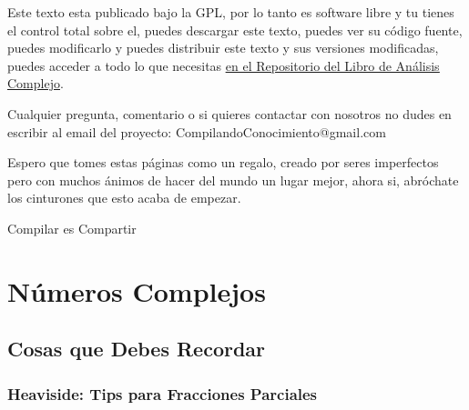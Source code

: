 \documentclass[12pt, fleqn]{report}                             %
\theoremstyle{break}                                            %
\begin{document}
    Este texto esta publicado bajo la GPL, por lo tanto es software libre y tu tienes el control total sobre
    el, puedes descargar este texto, puedes ver su código fuente, puedes modificarlo y puedes distribuir este
    texto y sus versiones modificadas, puedes acceder a todo lo que necesitas 
    \href{http://www.github.com/CompilandoConocimiento/LibroAnalisisComplejo}
    {\underline{en el Repositorio del Libro de Análisis Complejo}}. 

    Cualquier pregunta, comentario o si quieres contactar con nosotros no dudes en escribir al email del proyecto:
    CompilandoConocimiento@gmail.com

    Espero que tomes estas páginas como un regalo, creado por seres imperfectos pero con muchos ánimos de hacer
    del mundo un lugar mejor, ahora si, abróchate los cinturones que esto acaba de empezar.

    \begin{flushright}
        Compilar es Compartir
    \end{flushright}







\part{Números Complejos}
\clearpage


    \chapter{Cosas que Debes Recordar}


        \clearpage
        \section{Heaviside: Tips para Fracciones Parciales}
\end{document}

